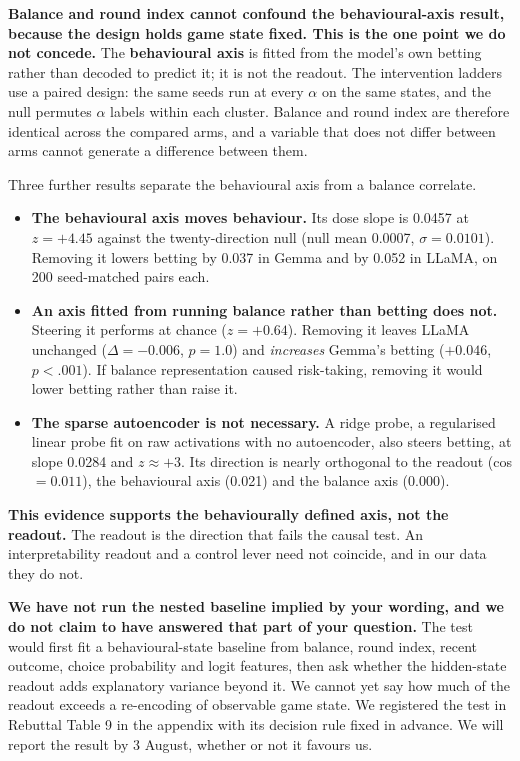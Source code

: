 \textbf{Balance and round index cannot confound the behavioural-axis result, because the design
holds game state fixed. This is the one point we do not concede.} The \textbf{behavioural axis} is
fitted from the model's own betting rather than decoded to predict it; it is not the readout. The
intervention ladders use a paired design: the same seeds run at every $\alpha$ on the same states,
and the null permutes $\alpha$ labels within each cluster. Balance and round index are therefore
identical across the compared arms, and a variable that does not differ between arms cannot generate
a difference between them.

Three further results separate the behavioural axis from a balance correlate.

\begin{itemize}
\item \textbf{The behavioural axis moves behaviour.} Its dose slope is 0.0457 at $z = +4.45$
against the twenty-direction null (null mean 0.0007, $\sigma = 0.0101$). Removing it lowers betting
by 0.037 in Gemma and by 0.052 in LLaMA, on 200 seed-matched pairs each.

\item \textbf{An axis fitted from running balance rather than betting does not.} Steering it
performs at chance ($z = +0.64$). Removing it leaves LLaMA unchanged ($\Delta = -0.006$,
$p = 1.0$) and \emph{increases} Gemma's betting ($+0.046$, $p < .001$). If balance representation
caused risk-taking, removing it would lower betting rather than raise it.

\item \textbf{The sparse autoencoder is not necessary.} A ridge probe, a regularised linear probe
fit on raw activations with no autoencoder, also steers betting, at slope 0.0284 and
$z \approx +3$. Its direction is nearly orthogonal to the readout (cos $= 0.011$), the behavioural
axis (0.021) and the balance axis (0.000).
\end{itemize}

\textbf{This evidence supports the behaviourally defined axis, not the readout.} The readout is the
direction that fails the causal test. An interpretability readout and a control lever need not
coincide, and in our data they do not.

\textbf{We have not run the nested baseline implied by your wording, and we do not claim to have
answered that part of your question.} The test would first fit a behavioural-state baseline from
balance, round index, recent outcome, choice probability and logit features, then ask whether the
hidden-state readout adds explanatory variance beyond it. We cannot yet say how much of the readout
exceeds a re-encoding of observable game state. We registered the test in Rebuttal Table 9 in the
appendix with its decision rule fixed in advance. We will report the result by 3 August, whether or
not it favours us.

